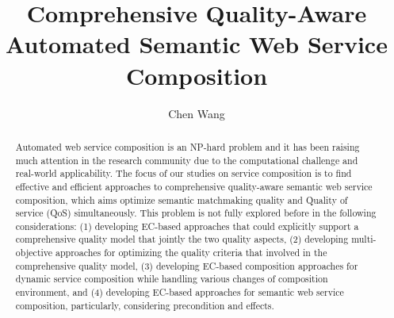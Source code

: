 \documentclass[11pt
              , a4paper
              , twoside
              , openright
              ]{report}
\title{Comprehensive Quality-Aware Automated Semantic Web Service Composition}
\author{Chen Wang}
\begin{document}
\frontmatter



\begin{abstract}
Automated web service composition is an NP-hard problem and it has been raising much attention in the research community due to the computational challenge and real-world applicability. The focus of our studies on service composition is to find effective and efficient approaches to comprehensive quality-aware semantic web service composition, which aims optimize semantic matchmaking quality and Quality of service (QoS) simultaneously. This problem is not fully explored before in the following considerations: (1) developing EC-based approaches that could explicitly support a comprehensive quality model that jointly the two quality aspects, (2) developing multi-objective approaches for optimizing the quality criteria that involved in the comprehensive quality model, (3) developing EC-based  composition approaches for dynamic service composition while handling various changes of composition environment, and  (4) developing EC-based approaches for semantic web service composition, particularly, considering precondition and effects.
\end{abstract}


\maketitle

%

\tableofcontents



\mainmatter








\backmatter





\end{document}
